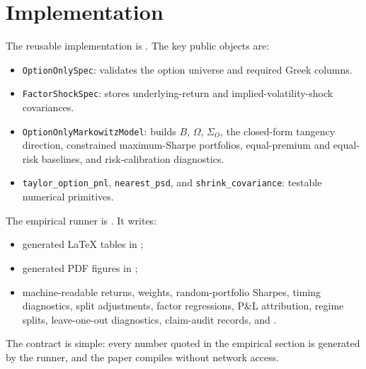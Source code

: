 \section{Implementation}

The reusable implementation is
.  The key public
objects are:
\begin{itemize}[leftmargin=2em]
  \item \texttt{OptionOnlySpec}: validates the option universe and
  required Greek columns.
  \item \texttt{FactorShockSpec}: stores underlying-return and
  implied-volatility-shock covariances.
  \item \texttt{OptionOnlyMarkowitzModel}: builds $B$, $\Omega$,
  $\Sigma_O$, the closed-form tangency direction, constrained
  maximum-Sharpe portfolios, equal-premium and equal-risk baselines, and
  risk-calibration diagnostics.
  \item \texttt{taylor\_option\_pnl}, \texttt{nearest\_psd}, and
  \texttt{shrink\_covariance}: testable numerical primitives.
\end{itemize}

The empirical runner is
.
It writes:
\begin{itemize}[leftmargin=2em]
  \item generated LaTeX tables in ;
  \item generated PDF figures in ;
  \item machine-readable returns, weights, random-portfolio Sharpes,
  timing diagnostics, split adjustments, factor regressions, P\&L
  attribution, regime splits, leave-one-out diagnostics, claim-audit
  records, and .
\end{itemize}

The contract is simple: every number quoted in the empirical section is
generated by the runner, and the paper compiles without network access.

